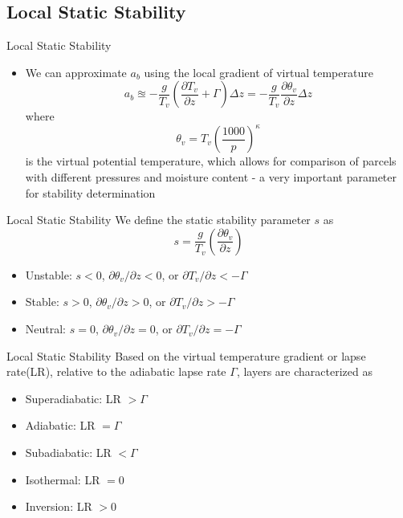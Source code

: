 \subsection{Local Static Stability}
\begin{frame}{Local Static Stability}
\begin{itemize}
	\item We can approximate $a_b$ using the local gradient of virtual temperature
	$$a_b \approxeq -\frac{g}{T_v}\left(\frac{\partial T_v}{\partial z} + \Gamma\right)\Delta z = -\frac{g}{T_v}\frac{\partial \theta_v}{\partial z}\Delta z$$
	where
	$$\theta_v = T_v\left(\frac{1000}{p}\right)^\kappa$$
	is the virtual potential temperature, which allows for comparison of parcels with different pressures and moisture content - a very important parameter for stability determination
\end{itemize}
\end{frame}
\begin{frame}{Local Static Stability}
We define the static stability parameter $s$ as
$$s = \frac{g}{T_v}\left(\frac{\partial \theta_v}{\partial z}\right)$$
\begin{itemize}
	\item Unstable: $s<0$, $\partial \theta_v/\partial z < 0$, or $\partial T_v/\partial z < -\Gamma$
	\item Stable: $s>0$, $\partial \theta_v/\partial z > 0$, or $\partial T_v/\partial z > -\Gamma$
	\item Neutral: $s=0$, $\partial \theta_v/\partial z = 0$, or $\partial T_v/\partial z = -\Gamma$
\end{itemize}
\end{frame}
\begin{frame}{Local Static Stability}
Based on the virtual temperature gradient or lapse rate(LR), relative to the adiabatic lapse rate $\Gamma$, layers are characterized as
\begin{itemize}
	\item Superadiabatic: LR $> \Gamma$
	\item Adiabatic: LR $= \Gamma$
	\item Subadiabatic: LR $< \Gamma$
	\item Isothermal: LR $= 0$
	\item Inversion: LR $>0$
\end{itemize}
\end{frame}
